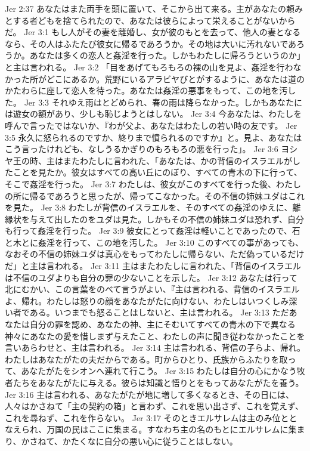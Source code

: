 Jer 2:37  あなたはまた両手を頭に置いて、そこから出て来る。主があなたの頼みとする者どもを捨てられたので、あなたは彼らによって栄えることがないからだ。
Jer 3:1  もし人がその妻を離婚し、女が彼のもとを去って、他人の妻となるなら、その人はふたたび彼女に帰るであろうか。その地は大いに汚れないであろうか。あなたは多くの恋人と姦淫を行った。しかもわたしに帰ろうというのか」と主は言われる。
Jer 3:2  「目をあげてもろもろの裸の山を見よ、姦淫を行わなかった所がどこにあるか。荒野にいるアラビヤびとがするように、あなたは道のかたわらに座して恋人を待った。あなたは姦淫の悪事をもって、この地を汚した。
Jer 3:3  それゆえ雨はとどめられ、春の雨は降らなかった。しかもあなたには遊女の額があり、少しも恥じようとはしない。
Jer 3:4  今あなたは、わたしを呼んで言ったではないか、『わが父よ、あなたはわたしの若い時の友です。
Jer 3:5  永久に怒られるのですか、終りまで憤られるのですか』と。見よ、あなたはこう言ったけれども、なしうるかぎりのもろもろの悪を行った」。
Jer 3:6  ヨシヤ王の時、主はまたわたしに言われた、「あなたは、かの背信のイスラエルがしたことを見たか。彼女はすべての高い丘にのぼり、すべての青木の下に行って、そこで姦淫を行った。
Jer 3:7  わたしは、彼女がこのすべてを行った後、わたしの所に帰るであろうと思ったが、帰ってこなかった。その不信の姉妹ユダはこれを見た。
Jer 3:8  わたしが背信のイスラエルを、そのすべての姦淫のゆえに、離縁状を与えて出したのをユダは見た。しかもその不信の姉妹ユダは恐れず、自分も行って姦淫を行った。
Jer 3:9  彼女にとって姦淫は軽いことであったので、石と木とに姦淫を行って、この地を汚した。
Jer 3:10  このすべての事があっても、なおその不信の姉妹ユダは真心をもってわたしに帰らない、ただ偽っているだけだ」と主は言われる。
Jer 3:11  主はまたわたしに言われた、「背信のイスラエルは不信のユダよりも自分の罪の少ないことを示した。
Jer 3:12  あなたは行って北にむかい、この言葉をのべて言うがよい、『主は言われる、背信のイスラエルよ、帰れ。わたしは怒りの顔をあなたがたに向けない、わたしはいつくしみ深い者である。いつまでも怒ることはしないと、主は言われる。
Jer 3:13  ただあなたは自分の罪を認め、あなたの神、主にそむいてすべての青木の下で異なる神々にあなたの愛を惜しまず与えたこと、わたしの声に聞き従わなかったことを言いあらわせと、主は言われる。
Jer 3:14  主は言われる、背信の子らよ、帰れ。わたしはあなたがたの夫だからである。町からひとり、氏族からふたりを取って、あなたがたをシオンへ連れて行こう。
Jer 3:15  わたしは自分の心にかなう牧者たちをあなたがたに与える。彼らは知識と悟りとをもってあなたがたを養う。
Jer 3:16  主は言われる、あなたがたが地に増して多くなるとき、その日には、人々はかさねて「主の契約の箱」と言わず、これを思い出さず、これを覚えず、これを尋ねず、これを作らない。
Jer 3:17  そのときエルサレムは主のみ位ととなえられ、万国の民はここに集まる。すなわち主の名のもとにエルサレムに集まり、かさねて、かたくなに自分の悪い心に従うことはしない。
